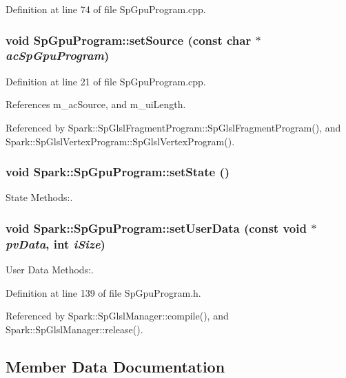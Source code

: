 Definition at line 74 of file Sp\-Gpu\-Program.cpp.
\subsubsection{\setlength{\rightskip}{0pt plus 5cm}void Sp\-Gpu\-Program::set\-Source (const char $\ast$ {\em ac\-Sp\-Gpu\-Program})}\label{classSpark_1_1SpGpuProgram_a2}


Definition at line 21 of file Sp\-Gpu\-Program.cpp.

References m\_\-ac\-Source, and m\_\-ui\-Length.

Referenced by Spark::Sp\-Glsl\-Fragment\-Program::Sp\-Glsl\-Fragment\-Program(), and Spark::Sp\-Glsl\-Vertex\-Program::Sp\-Glsl\-Vertex\-Program().
\subsubsection{\setlength{\rightskip}{0pt plus 5cm}void Spark::Sp\-Gpu\-Program::set\-State ()}\label{classSpark_1_1SpGpuProgram_a7}


State Methods:. 

\subsubsection{\setlength{\rightskip}{0pt plus 5cm}void Spark::Sp\-Gpu\-Program::set\-User\-Data (const void $\ast$ {\em pv\-Data}, int {\em i\-Size})\hspace{0.3cm}{\tt  [inline]}}\label{classSpark_1_1SpGpuProgram_a5}


User Data Methods:. 

Definition at line 139 of file Sp\-Gpu\-Program.h.

Referenced by Spark::Sp\-Glsl\-Manager::compile(), and Spark::Sp\-Glsl\-Manager::release().

\subsection{Member Data Documentation}
